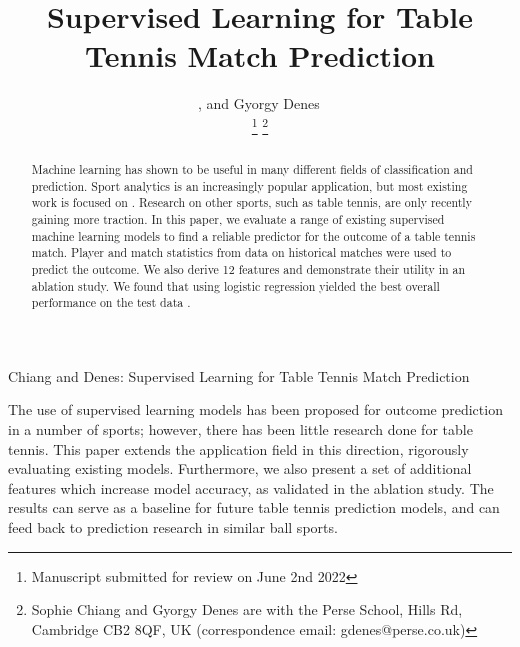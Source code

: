 \documentclass[journal]{IEEEtai}
\begin{document}
\title{Supervised Learning for Table Tennis Match Prediction}
\author{, and
    Gyorgy Denes\,

\thanks{Manuscript submitted for review on  June 2nd 2022} 
\thanks{Sophie Chiang and Gyorgy Denes are with the Perse School, Hills Rd, Cambridge CB2 8QF, UK (correspondence email: gdenes@perse.co.uk)}
}

{Chiang and Denes: Supervised Learning for Table Tennis Match Prediction}



\maketitle


\begin{abstract}
Machine learning has shown to be useful in many different fields of classification and prediction. Sport analytics is an increasingly popular application, but most existing work is focused on . Research on other sports, such as table tennis, are only recently gaining more traction. In this paper, we evaluate a range of existing supervised machine learning models to find a reliable predictor for the outcome of a table tennis match. Player and match statistics from data on historical matches were used to predict the outcome. We also derive 12 features and demonstrate their utility in an ablation study. We found that using logistic regression yielded the best overall performance on the test data .
\end{abstract}

\begin{IEEEImpStatement}
The use of supervised learning models has been proposed for outcome prediction in a number of sports; however, there has been little research done for table tennis. This paper extends the application field in this direction, rigorously evaluating existing models. Furthermore, we also present a set of additional features which increase model accuracy, as validated in the ablation study. The results can serve as a baseline for future table tennis prediction models, and can feed back to prediction research in similar ball sports.
\end{IEEEImpStatement}
\end{document}
